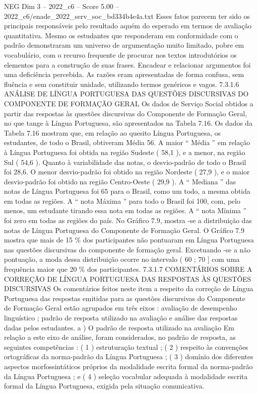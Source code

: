 \begin{textsample}{NEG Dim 3 – 2022\_c6 – Score 5.00 – 2022\_c6/enade\_2022\_serv\_soc\_bd334b4e4a.txt}
Esses fatos parecem ter sido os principais responsáveis pelo resultado aquém do esperado em termos de avaliação quantitativa.
Mesmo os estudantes que responderam em conformidade com o padrão demonstraram um universo de argumentação muito limitado, pobre em vocabulário, com o recurso frequente de procurar nos textos introdutórios os elementos para a construção de suas frases.
Encadear e relacionar argumentos foi uma deficiência percebida.
As razões eram apresentadas de forma confusa, sem fluência e sem constituir unidade, utilizando termos genéricos e vagos. 7.3.1.6 ANÁLISE DE LÍNGUA PORTUGUESA DAS QUESTÕES DISCURSIVAS DO COMPONENTE DE FORMAÇÃO GERAL Os dados de Serviço Social obtidos a partir das respostas às questões discursivas do Componente de Formação Geral, no que tange à Língua Portuguesa, são apresentados na Tabela 7.16.
Os dados da Tabela 7.16 mostram que, em relação ao quesito Língua Portuguesa, os estudantes, de todo o Brasil, obtiveram Média 56.
A maior “ Média ” em relação à Língua Portuguesa foi obtida na região Sudeste ( 58,1 ), e a menor, na região Sul ( 54,6 ).
Quanto à variabilidade das notas, o desvio-padrão de todo o Brasil foi 28,6.
O menor desvio-padrão foi obtido na região Nordeste ( 27,9 ), e o maior desvio-padrão foi obtido na região Centro-Oeste ( 29,9 ).
A “ Mediana ” das notas de Língua Portuguesa foi 65 para o Brasil, como um todo, a mesma obtida em todas as regiões.
A “ nota Máxima ” para todo o Brasil foi 100, com, pelo menos, um estudante tirando essa nota em todas as regiões.
A “ nota Mínima ” foi zero em todas as regiões do país.
No Gráfico 7.9, mostra -se a distribuição das notas de Língua Portuguesa do Componente de Formação Geral.
O Gráfico 7.9 mostra que mais de 15 \% dos participantes não pontuaram em Língua Portuguesa nas questões discursivas do componente de formação geral.
Excetuando -se a não pontuação, a moda dessa distribuição ocorre no intervalo ( 60 ; 70 ] com uma frequência maior que 20 \% dos participantes. 7.3.1.7 COMENTÁRIOS SOBRE A CORREÇÃO DE LÍNGUA PORTUGUESA DAS RESPOSTAS ÀS QUESTÕES DISCURSIVAS Os comentários feitos neste item a respeito da correção de Língua Portuguesa das respostas emitidas para as questões discursivas do Componente de Formação Geral estão agrupados em três eixos : avaliação de desempenho linguístico ; padrão de resposta utilizado na avaliação e análise das respostas dadas pelos estudantes. a ) O padrão de resposta utilizado na avaliação Em relação a este eixo de análise, foram considerados, no padrão de resposta, as seguintes competências : ( 1 ) estruturação textual ; ( 2 ) respeito às convenções ortográficas da norma-padrão da Língua Portuguesa ; ( 3 ) domínio dos diferentes aspectos morfossintáticos próprios da modalidade escrita formal da norma-padrão da Língua Portuguesa ; e ( 4 ) seleção vocabular adequada à modalidade escrita formal da Língua Portuguesa, exigida pela situação comunicativa.

\end{textsample}
